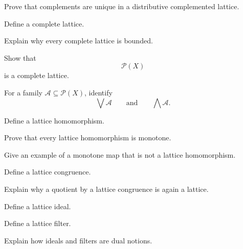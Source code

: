 \begin{exercise}[3]
Prove that complements are unique in a distributive complemented lattice.
\end{exercise}

\begin{exercise}[1]
Define a complete lattice.
\end{exercise}

\begin{exercise}[2]
Explain why every complete lattice is bounded.
\end{exercise}

\begin{exercise}[2]
Show that
\[ \mathcal P(X) \]
is a complete lattice.
\end{exercise}

\begin{exercise}[2]
For a family \(\mathcal A\subseteq\mathcal P(X)\), identify
\[ \bigvee\mathcal A\qquad\text{and}\qquad\bigwedge\mathcal A. \]
\end{exercise}

\begin{exercise}[1]
Define a lattice homomorphism.
\end{exercise}

\begin{exercise}[2]
Prove that every lattice homomorphism is monotone.
\end{exercise}

\begin{exercise}[2]
Give an example of a monotone map that is not a lattice homomorphism.
\end{exercise}

\begin{exercise}[1]
Define a lattice congruence.
\end{exercise}

\begin{exercise}[2]
Explain why a quotient by a lattice congruence is again a lattice.
\end{exercise}

\begin{exercise}[1]
Define a lattice ideal.
\end{exercise}

\begin{exercise}[1]
Define a lattice filter.
\end{exercise}

\begin{exercise}[2]
Explain how ideals and filters are dual notions.
\end{exercise}

